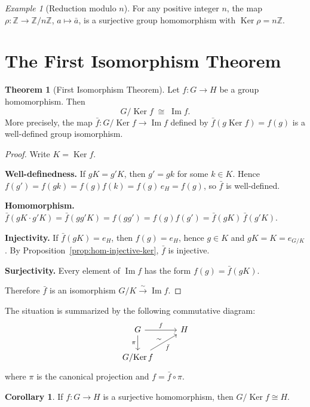 \documentclass[12pt,a4paper,openany]{book}
\theoremstyle{definition}
\newtheorem{theorem}{Theorem}[chapter]
\newtheorem{corollary}{Corollary}[chapter]
\theoremstyle{remark}
\newtheorem{example}{Example}[chapter]
\newcommand{\Z}{\mathbb{Z}}
\DeclareMathOperator{\Ker}{Ker}
\DeclareMathOperator{\im}{Im}
\begin{document}
\begin{example}[Reduction modulo $n$]\label{ex:reduction-mod}
For any positive integer $n$, the map $\rho\colon\Z\to\Z/n\Z$,
$a\mapsto\bar{a}$, is a surjective group homomorphism with
$\Ker\rho=n\Z$.
\end{example}

\section{The First Isomorphism Theorem}\label{sec:first-iso}

\begin{theorem}[First Isomorphism Theorem]\label{thm:first-iso}
Let $f\colon G\to H$ be a group homomorphism.  Then
\[
   G/\!\Ker f \;\cong\; \im f.
\]
More precisely, the map $\bar{f}\colon G/\!\Ker f\to\im f$ defined by
$\bar{f}(g\Ker f)=f(g)$ is a well-defined group isomorphism.
\end{theorem}

\begin{proof}
Write $K=\Ker f$.

\textbf{Well-definedness.}
If $gK = g'K$, then $g' = gk$ for some $k\in K$.
Hence $f(g')=f(gk)=f(g)f(k)=f(g)\,e_H=f(g)$, so $\bar f$ is
well-defined.

\textbf{Homomorphism.}
$\bar{f}(gK\cdot g'K)=\bar{f}(gg'K)=f(gg')=f(g)f(g')
=\bar{f}(gK)\,\bar{f}(g'K)$.

\textbf{Injectivity.}
If $\bar{f}(gK)=e_H$, then $f(g)=e_H$, hence $g\in K$ and $gK=K=e_{G/K}$.
By Proposition~\ref{prop:hom-injective-ker}, $\bar f$ is injective.

\textbf{Surjectivity.}
Every element of $\im f$ has the form $f(g)=\bar{f}(gK)$.

Therefore $\bar f$ is an isomorphism $G/K\xrightarrow{\;\sim\;}\im f$.
\end{proof}

The situation is summarized by the following commutative diagram:
\[
\begin{tikzcd}
G \arrow[r,"f"] \arrow[d,"\pi"'] & H \\
G/\!\Ker f \arrow[ru,"\bar{f}"',"\sim"] &
\end{tikzcd}
\]
where $\pi$ is the canonical projection and $f = \bar{f}\circ\pi$.

\begin{corollary}\label{cor:first-iso-surjective}
If $f\colon G\to H$ is a surjective homomorphism, then $G/\!\Ker f\cong H$.
\end{corollary}
\end{document}

